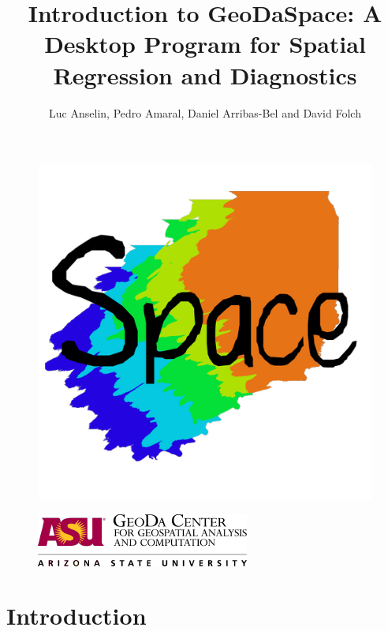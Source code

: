 \documentclass{article}
\title{Introduction to GeoDaSpace: A Desktop Program for Spatial Regression and Diagnostics}
\author{Luc Anselin, Pedro Amaral, Daniel Arribas-Bel and David Folch}
\begin{document}
\maketitle
\thispagestyle{empty}

\vfill

\begin{figure}[htb]
\begin{center}
\includegraphics[width=0.5\linewidth]{geodaspace.png}\\
\end{center}
\end{figure}

\vfill

\begin{figure}[htb]
\begin{center}
\includegraphics[width=0.75\linewidth]{GeodaLogo.png}\\
\end{center}
\end{figure}


\clearpage
\pagestyle{plain}

\setcounter{secnumdepth}{3} 
\setcounter{tocdepth}{2}   

\renewcommand\contentsname{Table of Contents}
\tableofcontents

\newpage



\section{Introduction}
\label{s:intro}
\end{document}
